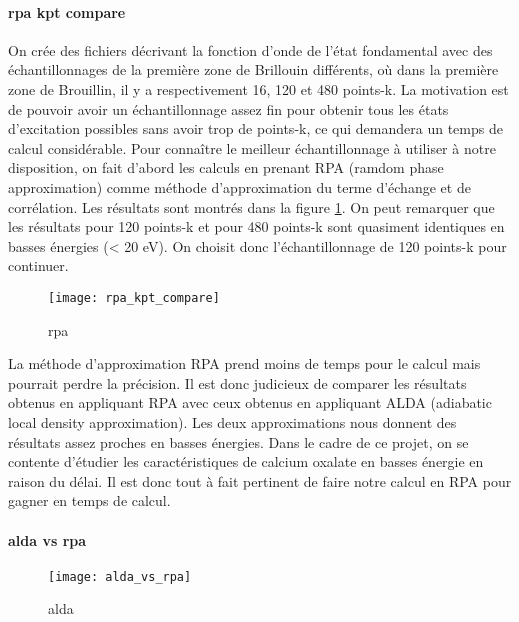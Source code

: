 
\paragraph{rpa kpt compare} 
On crée des fichiers décrivant la fonction d'onde de l'état fondamental avec des échantillonnages de la première zone de Brillouin différents, où dans la première zone de Brouillin, il y a respectivement 16, 120 et 480 points-k. 
La motivation est de pouvoir avoir un échantillonnage assez fin pour obtenir tous les états d'excitation possibles sans avoir trop de points-k, ce qui demandera un temps de calcul considérable.
Pour connaître le meilleur échantillonnage à utiliser à notre disposition, on fait d'abord les calculs en prenant RPA (ramdom phase approximation) comme méthode d'approximation du terme d'échange et de corrélation.
Les résultats sont montrés dans la figure \ref{kptCompare}. 
On peut remarquer que les résultats pour 120 points-k et pour 480 points-k sont quasiment identiques en basses énergies (< 20 eV).
On choisit donc l'échantillonnage de 120 points-k pour continuer.

\begin{figure}[!h]\label{kptCompare}
    \centering
    \texttt{[image: rpa\_kpt\_compare]}
    \caption{rpa}
\end{figure}

La méthode d'approximation RPA prend moins de temps pour le calcul mais pourrait perdre la précision. Il est donc judicieux de comparer les résultats obtenus en appliquant RPA avec ceux obtenus en appliquant ALDA (adiabatic local density approximation).
Les deux approximations nous donnent des résultats assez proches en basses énergies.
Dans le cadre de ce projet, on se contente d'étudier les caractéristiques de calcium oxalate en basses énergie en raison du délai.
Il est donc tout à fait pertinent de faire notre calcul en RPA pour gagner en temps de calcul.
\paragraph{alda vs rpa}\label{aldaRPA}
\begin{figure}[!h]
    \centering
    \texttt{[image: alda\_vs\_rpa]}
    \caption{alda}
\end{figure}


